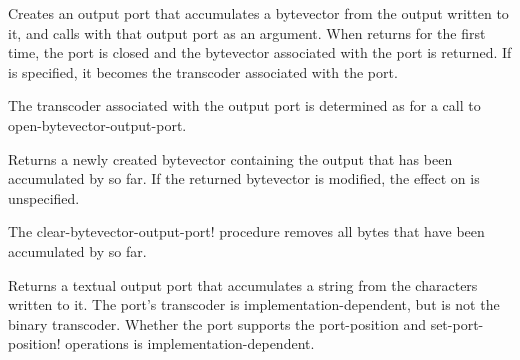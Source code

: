 \begin{entry}{%
}

Creates an output port that accumulates a bytevector from the output
written to it, and calls  with that output port as an
argument. When  returns for the first time, the port is
closed and the bytevector associated with the port is returned.  If
 is specified, it becomes the transcoder associated
with the port.

The transcoder associated with the output port is determined
as for a call to {\cf open-bytevector-output-port}.
\end{entry}

\begin{entry}{%
}

Returns a newly created bytevector containing the output that has
been accumulated by  so far.
If the returned bytevector is modified,
the effect on  is unspecified.
\end{entry}

\begin{entry}{%
}

The {\cf clear-bytevector-output-port!} procedure removes all bytes that
have been accumulated by  so far.
\end{entry}

\begin{entry}{%
}

Returns a textual output port that accumulates a string from the
characters written to it.
The port's transcoder is implementation-dependent,
but is not the binary transcoder.
Whether the port supports
the {\cf port-position} and {\cf set-port-position!} operations
is implementation-dependent.
\end{entry}

